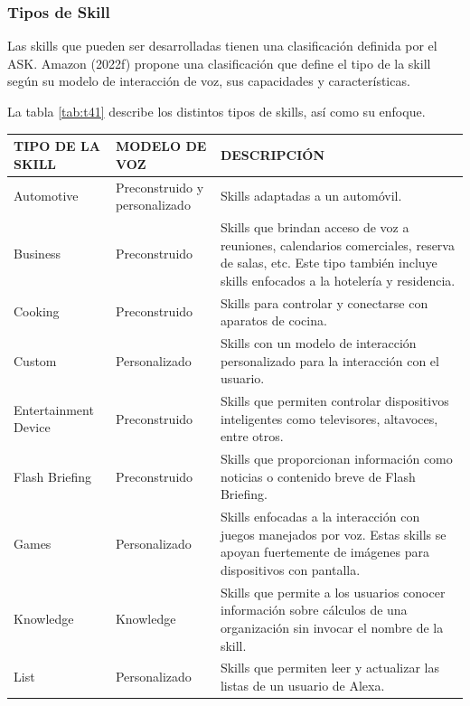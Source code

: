 \subsubsection{Tipos de Skill}
\label{TiposSkillcapIV}

Las skills que pueden ser desarrolladas tienen una clasificación definida por el ASK. Amazon (2022f) propone una clasificación que define el tipo de la skill según su modelo de interacción de voz, sus capacidades y características.

La tabla \ref{tab:t41} describe los distintos tipos de skills, así como su enfoque.

\begin{table}[t]
  \begin{center}
    \begin{tabular}{ | p{4cm} | p{4cm} | p{8cm} | }
      \hline
      TIPO DE LA SKILL & MODELO DE VOZ & DESCRIPCIÓN  \\ \hline
      Automotive & Preconstruido y personalizado & Skills adaptadas a un automóvil. \\ \hline
      Business & Preconstruido & Skills que brindan acceso de voz a reuniones, calendarios comerciales, reserva de salas, etc. Este tipo también incluye skills enfocados a la hotelería y residencia. \\ \hline
      Cooking & Preconstruido & Skills para controlar y conectarse con aparatos de cocina. \\ \hline
      Custom & Personalizado & Skills con un modelo de interacción personalizado para la interacción con el usuario. \\ \hline
      Entertainment Device & Preconstruido & Skills que permiten controlar dispositivos inteligentes como televisores, altavoces, entre otros. \\ \hline
      Flash Briefing & Preconstruido & Skills que proporcionan información como noticias o contenido breve de Flash Briefing. \\ \hline
      Games & Personalizado & Skills enfocadas a la interacción con juegos manejados por voz. Estas skills se apoyan fuertemente de imágenes para dispositivos con pantalla. \\ \hline
      Knowledge & Knowledge & Skills que permite a los usuarios conocer información sobre cálculos de una organización sin invocar el nombre de la skill. \\ \hline
      List & Personalizado & Skills que permiten leer y actualizar las listas de un usuario de Alexa. \\ \hline

\end{tabular}
\end{center}
\end{table}
